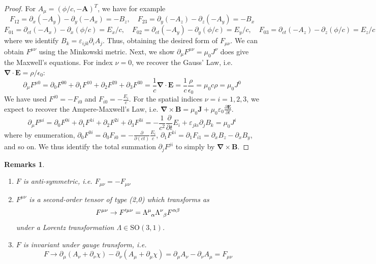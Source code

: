 \documentclass[a4paper]{article}
\newtheorem{remarks}{Remarks}[section]
\theoremstyle{new}
\begin{document}
\begin{proof}
For $A_\mu=(\phi/c,-\mathbf{A})^T$, we have for example
$$F_{12}=\partial_x(-A_y)-\partial_y(-A_x)=-B_z,\quad F_{23}=\partial_y(-A_z)-\partial_z(-A_y)=-B_x$$
$$F_{01}=\partial_{ct}(-A_x)-\partial_x(\phi/c)=E_x/c,\quad
F_{02}=\partial_{ct}(-A_y)-\partial_y(\phi/c)=E_y/c,\quad F_{03}=\partial_{ct}(-A_z)-\partial_z(\phi/c)=E_z/c$$
where we identify $B_k=\varepsilon_{ijk}\partial_iA_j$. 
Thus, obtaining the desired form of $F_{\mu\nu}$. We can obtain $F^{\mu\nu}$ using the Minkowski metric. Next, we show $\partial_\mu F^{\mu\nu}=\mu_0J^\nu$ does give the Maxwell's equations. For index $\nu=0$, we recover the Gauss' Law, i.e. $\boldsymbol{\nabla}\cdot\mathbf{E}=\rho/\epsilon_0$:
$$\partial_\mu F^{\mu0}=\partial_0F^{00}+\partial_1F^{10}+\partial_2F^{20}+\partial_3F^{30}=\frac{1}{c}\boldsymbol{\nabla}\cdot\mathbf{E}=\frac{1}{c}\frac{\rho}{\epsilon_0}=\mu_0c\rho=\mu_0J^0$$
We have used $F^{i0}=-F_{i0}$ and  $F_{i0}=-\frac{E_i}{c}$. For the spatial indices $\nu=i=1,2,3$, we expect to recover the Ampere-Maxwell's Law, i.e. $\boldsymbol{\nabla}\times\mathbf{B}=\mu_0\mathbf{J}+\mu_0\varepsilon_0\frac{\partial\mathbf{E}}{\partial t}$.
$$\partial_\mu F^{\mu i}=\partial_0F^{0i}+\partial_1F^{1i}+\partial_2F^{2i}+\partial_3F^{3i}=-\frac{1}{c^2}\frac{\partial}{\partial t}E_i+\varepsilon_{jki}\partial_jB_k=\mu_0J^i$$
where by enumeration, $\partial_0F^{0i}=\partial_0F_{i0}=-\frac{\partial}{\partial(ct)}\frac{E_i}{c}$, $\partial_1F^{1i}=\partial_1F_{i1}=\partial_xB_z-\partial_xB_y$, and so on. We thus identify the total summation $\partial_jF^{ji}$ to simply by $\boldsymbol{\nabla}\times\mathbf{B}$.
\end{proof}
\begin{remarks}\leavevmode
\begin{enumerate}
    \item $F$ is anti-symmetric, i.e. $F_{\mu\nu}=-F_{\mu\nu}$
    \item $F^{\mu\nu}$ is a second-order tensor of type (2,0) which transforms as
$$F^{\mu\nu}\rightarrow F'^{\mu\nu}=\tensor*{\Lambda}{*_{}^{\mu}_{\alpha}}\tensor*{\Lambda}{*_{}^{\nu}_{\beta}} F^{\alpha\beta}$$
under a Lorentz transformation $\Lambda\in\text{SO}(3,1)$.
\item $F$ is invariant under gauge transform, i.e.
$$F\rightarrow \partial_\mu(A_\nu+\partial_\nu\chi)-\partial_\nu(A_\mu+\partial_\mu\chi)=\partial_\mu A_\nu-\partial_\nu A_\mu=F_{\mu\nu}$$
\end{enumerate}
\end{remarks}
\end{document}
